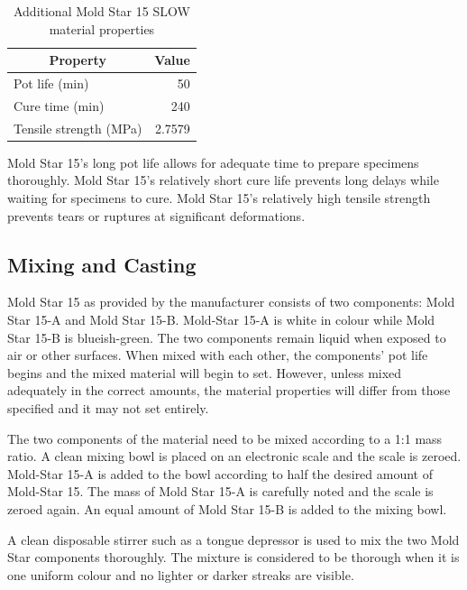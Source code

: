 \begin{table}[H]
\centering
\caption[Mold Star 15 material properties]{Additional Mold Star 15 SLOW material properties \citep{MoldStar}}
\label{tab:msp}
\begin{tabular}{@{}lr@{}}
\toprule
\multicolumn{1}{c}{\textbf{Property}} & \multicolumn{1}{c}{\textbf{Value}} \\ \midrule
Pot life (\si{\minute})                        & 50                                 \\
Cure time (\si{\minute})                       & 240                                \\
Tensile strength (\si{MPa})                & 2.7579                             \\ \bottomrule
\end{tabular}
\end{table}

Mold Star 15's long pot life allows for adequate time to prepare specimens thoroughly. Mold Star 15's relatively short cure life prevents long delays while waiting for specimens to cure. Mold Star 15's relatively high tensile strength prevents tears or ruptures at significant deformations.

\subsection{Mixing and Casting}
\label{ssec:mac}

Mold Star 15 as provided by the manufacturer consists of two components: Mold Star 15-A and Mold Star 15-B. Mold-Star 15-A is white in colour while Mold Star 15-B is blueish-green. The two components remain liquid when exposed to air or other surfaces. When mixed with each other, the components' pot life begins and the mixed material will begin to set. However, unless mixed adequately in the correct amounts, the material properties will differ from those specified and it may not set entirely.

The two components of the material need to be mixed according to a 1:1 mass ratio. A clean mixing bowl is placed on an electronic scale and the scale is zeroed. Mold-Star 15-A is added to the bowl according to half the desired amount of Mold-Star 15. The mass of Mold Star 15-A is carefully noted and the scale is zeroed again. An equal amount of Mold Star 15-B is added to the mixing bowl.

A clean disposable stirrer such as a tongue depressor is used to mix the two Mold Star components thoroughly. The mixture is considered to be thorough when it is one uniform colour and no lighter or darker streaks are visible.

